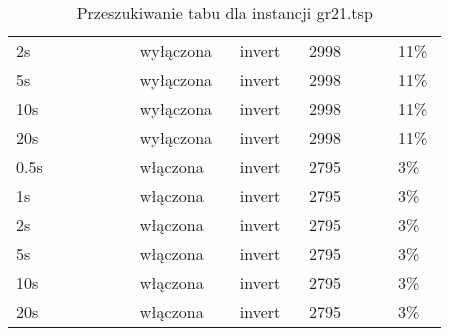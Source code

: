 \documentclass[12pt,a4paper,titlepage]{article}
\begin{document}
\begin{table}[H]
{\begin{tabular}{|p{0.25\linewidth}p{0.19\linewidth}p{0.14\linewidth}p{0.18\linewidth}p{0.1\linewidth}|}
        2s & wyłączona & invert & 2998 & 11\% \\
        5s & wyłączona & invert & 2998 & 11\% \\
        10s & wyłączona & invert & 2998 & 11\% \\
        20s & wyłączona & invert & 2998 & 11\% \\
        \hline
        0.5s & włączona & invert & 2795 & 3\% \\
        1s & włączona & invert & 2795 & 3\% \\
        2s & włączona & invert & 2795 & 3\% \\
        5s & włączona & invert & 2795 & 3\% \\
        10s & włączona & invert & 2795 & 3\% \\
        20s & włączona & invert & 2795 & 3\% \\
        \hline
	\end{tabular}}
	\caption{Przeszukiwanie tabu dla instancji gr21.tsp}
\end{table}
\end{document}

